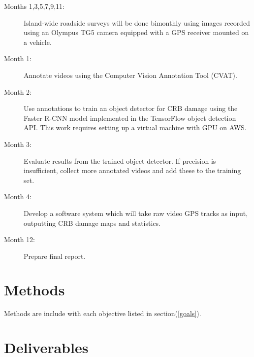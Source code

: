 \documentclass[14pt,english,letterpaper]{scrartcl}
\begin{document}
\begin{description}
	
	\item[Months 1,3,5,7,9,11:] Island-wide roadside surveys will be done bimonthly using images recorded using an Olympus TG5 camera equipped with a GPS receiver mounted on a vehicle.

	\item[Month 1:] Annotate videos using the Computer Vision Annotation Tool (CVAT).
	
	\item[Month 2:] Use annotations to train an object detector for CRB damage using the Faster R-CNN model implemented in the TensorFlow object detection API. This work requires setting up a virtual machine with GPU on AWS.
	
	\item[Month 3:] Evaluate results from the trained object detector. If precision is insufficient, collect more annotated videos and add these to the training set.
	
	\item[Month 4:] Develop a software system which will take raw video GPS tracks as input, outputting CRB damage maps and statistics.
	
	\item[Month 12:] Prepare final report.

\end{description}

\section{Methods} 


Methods are include with each objective listed in section(\ref{goals}).

\section{Deliverables} 

\end{document}
